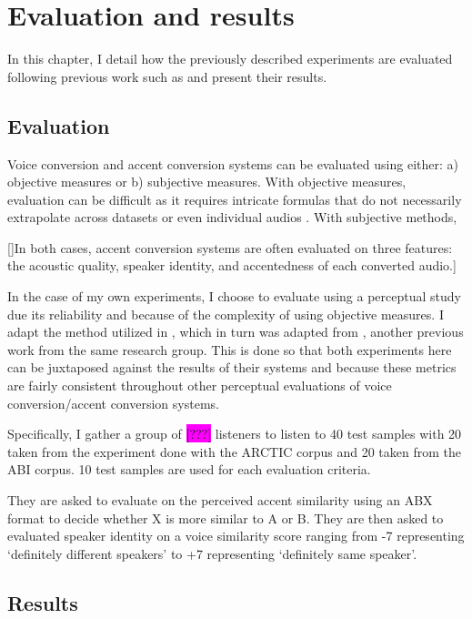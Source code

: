 \documentclass
[
    a4paper,
    twoside,
    12pt,
]
{report}
\begin{document}
\chapter{Evaluation and results}

In this chapter, I detail how the previously described experiments are
evaluated following previous work such as \textcite{zhao2018a} and
present their results.

\hypertarget{evaluation}{%
\section{Evaluation}\label{evaluation}}

Voice conversion and accent conversion systems can be evaluated using
either: a) objective measures or b) subjective measures. With objective
measures, evaluation can be difficult as it requires intricate formulas
that do not necessarily extrapolate across datasets or even individual
audios \parencite{felps2010}. With subjective methods,

{[}{]}In both cases, accent conversion systems are often evaluated on
three features: the acoustic quality, speaker identity, and accentedness
of each converted audio.{]}

In the case of my own experiments, I choose to evaluate using a
perceptual study due its reliability and because of the complexity of
using objective measures. I adapt the method utilized in
\textcite{zhao2018a}, which in turn was adapted from
\textcite{aryal2014}, another previous work from the same research
group. This is done so that both experiments here can be juxtaposed
against the results of their systems and because these metrics are
fairly consistent throughout other perceptual evaluations of voice
conversion/accent conversion systems.

Specifically, I gather a group of \colorbox{magenta}{[???]} listeners to
listen to 40 test samples with 20 taken from the experiment done with
the ARCTIC corpus and 20 taken from the ABI corpus. 10 test samples are
used for each evaluation criteria.

They are asked to evaluate on the perceived accent similarity using an
ABX format to decide whether X is more similar to A or B. They are then
asked to evaluated speaker identity on a voice similarity score ranging
from -7 representing `definitely different speakers' to +7 representing
`definitely same speaker'.

\hypertarget{results}{%
\section{Results}\label{results}}
\end{document}
